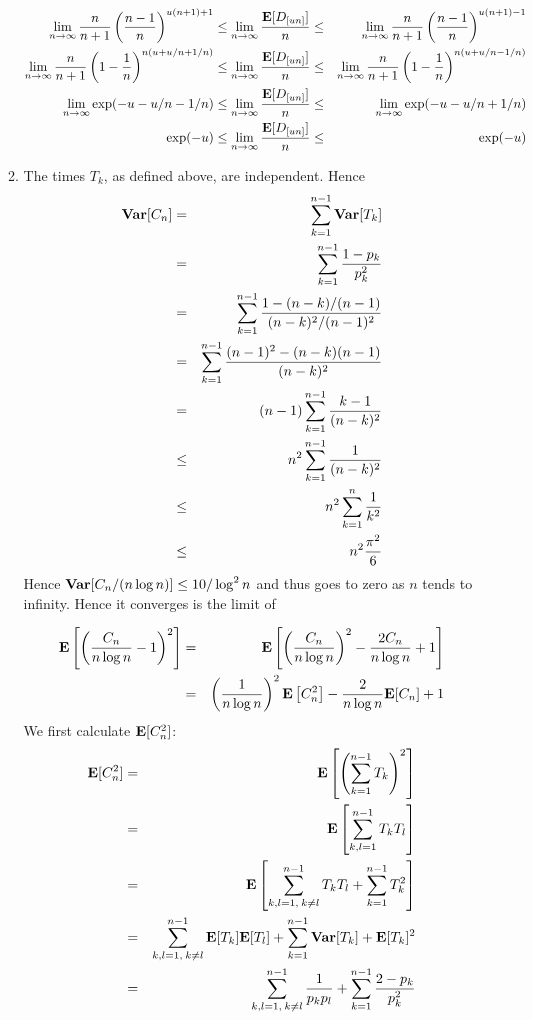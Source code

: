 \documentclass[11pt]{article} \usepackage{amssymb}
\newcommand{\E}{{\bf E}} \newcommand{\Cov}{{\bf Cov}}
\newcommand{\Var}{{\bf Var}} \newcommand{\Varx}{\mathop{\bf Var\/}}
\begin{document}
\begin{enumerate}
\begin{enumerate}
\begin{eqnarray*}
          \\ \lim_{n \to \infty}{n\over n+1}\left({n-1\over n}\right)^{u(n+1)+1} &\leq \lim_{n \to \infty}{\E[D_{[un]}]\over n} \leq& \lim_{n \to \infty}{n\over n+1}\left({n-1\over n}\right)^{u(n+1)-1}
          \\ \lim_{n \to \infty}{n\over n+1}\left(1-{1\over n}\right)^{n(u+u/n+1/n)} &\leq \lim_{n \to \infty}{\E[D_{[un]}]\over n} \leq& \lim_{n \to \infty}{n\over n+1}\left(1-{1\over n}\right)^{n(u+u/n-1/n)}
          \\ \lim_{n \to \infty}\exp(-u-u/n-1/n) &\leq \lim_{n \to \infty}{\E[D_{[un]}]\over n} \leq& \lim_{n \to \infty}\exp(-u-u/n+1/n)
          \\ \exp(-u) &\leq \lim_{n \to \infty}{\E[D_{[un]}]\over n} \leq& \exp(-u)
        \end{eqnarray*}
      \item
        The times $T_k$, as defined above, are independent. Hence
        \begin{eqnarray*}
          \Var[C_n] &=& \sum_{k=1}^{n-1}\Var[T_k]
          \\ &=& \sum_{k=1}^{n-1}{1-p_k \over p_k^2}
          \\ &=& \sum_{k=1}^{n-1}{1-(n-k)/(n-1) \over (n-k)^2/(n-1)^2}
          \\ &=& \sum_{k=1}^{n-1}{(n-1)^2-(n-k)(n-1) \over (n-k)^2}
          \\ &=& (n-1)\sum_{k=1}^{n-1}{k-1 \over (n-k)^2}
          \\ &\leq& n^2\sum_{k=1}^{n-1}{1 \over (n-k)^2}
          \\ &\leq& n^2\sum_{k=1}^n{1 \over k^2}
          \\ &\leq& n^2{\pi^2 \over 6}
        \end{eqnarray*}
        Hence $\Var[C_n/(n\log n)] \leq 10/\log^2n$ and thus goes to zero as
        $n$ tends to infinity. Hence it converges 
        is the limit of 



        \begin{eqnarray*}
          \E\left[\left({C_n\over n\log n}-1\right)^2\right] 
          &=& \E\left[\left({C_n\over n\log n}\right)^2-{2C_n\over n\log n}+1\right] 
          \\ &=& \left({1\over n\log n}\right)^2\E\left[C_n^2\right]-{2\over n\log n}\E[C_n]+1
        \end{eqnarray*}
        We first calculate $\E[C_n^2]$:
        \begin{eqnarray*}
          \E[C_n^2] &=& \E\left[\left(\sum_{k=1}^{n-1}T_k\right)^2\right]
          \\ &=& \E\left[\sum_{k,l=1}^{n-1}T_kT_l\right]
          \\ &=& \E\left[\sum_{k,l=1,\:k \neq l}^{n-1}T_kT_l+\sum_{k=1}^{n-1}T_k^2\right]
          \\ &=& \sum_{k,l=1,\:k \neq l}^{n-1}\E[T_k]\E[T_l]+\sum_{k=1}^{n-1}\Var[T_k]+\E[T_k]^2
          \\ &=& \sum_{k,l=1,\:k \neq l}^{n-1}{1\over p_kp_l}+\sum_{k=1}^{n-1}{2-p_k\over p_k^2}
        \end{eqnarray*}



\end{enumerate}
\end{enumerate}
\end{document}
